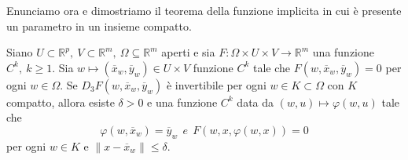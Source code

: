 
Enunciamo ora e dimostriamo il teorema della funzione implicita in cui è presente un parametro in un insieme compatto.
\begin{teorema}
Siano $U\subset\mathbb{R}^{p}, \ V\subset\mathbb{R}^{m}, \ \Omega\subseteq\mathbb{R}^{m}$ aperti e sia $F\colon \Omega\times U\times V\rightarrow\mathbb{R}^{m}$ una funzione $C^{k}, \ k\geq 1$. Sia $w\mapsto (\overline{x}_{w},\overline{y}_{w})\in U\times V$ funzione $C^{k}$ tale che $F(w,\overline{x}_{w},\overline{y}_{w})=0$ per ogni $w\in\Omega$. Se $D_{3}F(w,\overline{x}_{w},\overline{y}_{w})$ è invertibile per ogni $w\in K\subset\Omega$ con $K$ compatto, allora esiste $\delta >0$ e una funzione $C^{k}$ data da $(w,u)\mapsto\varphi(w,u)$ tale che
\begin{equation}
\varphi(w,\overline{x}_{w})=\overline{y}_{w} \ \ \textit{e} \ \ F(w,x,\varphi(w,x))=0
\end{equation}
per ogni $w\in K$ e $\|x-\overline{x}_{w}\|\leq\delta$.
\end{teorema}

